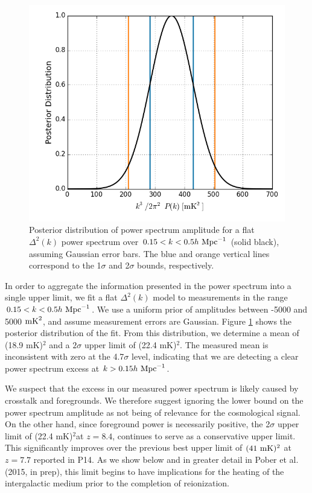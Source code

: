 \documentclass[twocolumn,numberedappendix]{emulateapj} \shorttitle{New Limits on the 21 cm Power Spectrum at $z=8.4$}
\newcommand{\hMpci}{h\ {\rm Mpc}^{-1}}
\newcommand{\mKlimit}{(22.4 mK)$^2$}
\newcommand{\pobercitet}{Pober et al. (2015, in prep)}
\begin{document}
\begin{figure}\centering
\includegraphics[width=\columnwidth]{plots/flat_k3pk_posterior.png}
\caption{
Posterior distribution of power spectrum amplitude for a flat $\Delta^{2}(k)$
power spectrum over $0.15<k<0.5\hMpci$ (solid black),
assuming Gaussian error bars. The blue and orange
vertical lines correspond to the 1$\sigma$ and 2$\sigma$ bounds, respectively.
}
\label{fig:final_posterior}
\end{figure}

In order to aggregate the information presented in the power spectrum into
a single upper limit, we fit a flat $\Delta^2(k)$ model to measurements
in the range $0.15<k<0.5\hMpci$.  We use a uniform prior of amplitudes between
-5000 and 5000 ${\rm mK}^2$, and assume measurement errors are Gaussian.
Figure \ref{fig:final_posterior} shows the posterior distribution of the fit.
From this distribution, we determine a mean of
(18.9 mK)$^2$ and a $2\sigma$ upper limit of \mKlimit.
The measured mean is inconsistent with zero at the 4.7$\sigma$ level, indicating that
we are detecting a clear power spectrum excess at $k>0.15\hMpci$.

We suspect that the excess in our measured power spectrum is likely caused
by crosstalk and foregrounds.  We therefore suggest ignoring the lower bound on the power spectrum amplitude
as not being of relevance for the cosmological signal.  On the other hand, since foreground
power is necessarily positive, the 
2$\sigma$ upper limit of \mKlimit at $z=8.4$, continues to serve as a conservative upper limit. This significantly improves over the previous
best upper limit of $(41~{\rm mK})^2$ at $z=7.7$ reported in P14.
As we show below and in
greater detail in \pobercitet, this limit begins to have implications
for the heating of the intergalactic medium prior to the completion of reionization.
\end{document}
